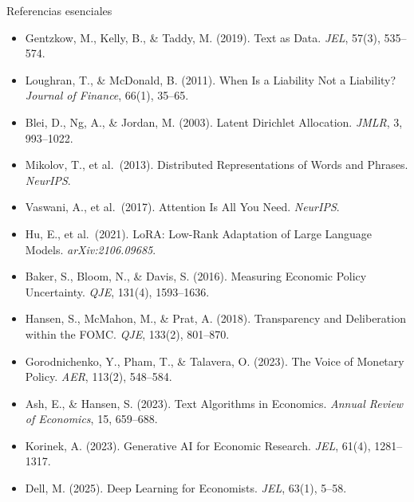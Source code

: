 \documentclass{beamer}
\newcommand{\1}{\mathbb{I}}
\begin{document}
\begin{frame}{Referencias esenciales}
\footnotesize
\begin{itemize}\itemsep2pt
  \item Gentzkow, M., Kelly, B., \& Taddy, M. (2019). Text as Data. \emph{JEL}, 57(3), 535--574.
  \item Loughran, T., \& McDonald, B. (2011). When Is a Liability Not a Liability? \emph{Journal of Finance}, 66(1), 35--65.
  \item Blei, D., Ng, A., \& Jordan, M. (2003). Latent Dirichlet Allocation. \emph{JMLR}, 3, 993--1022.
  \item Mikolov, T., et al.\ (2013). Distributed Representations of Words and Phrases. \emph{NeurIPS}.
  \item Vaswani, A., et al.\ (2017). Attention Is All You Need. \emph{NeurIPS}.
  \item Hu, E., et al.\ (2021). LoRA: Low-Rank Adaptation of Large Language Models. \emph{arXiv:2106.09685}.
  \item Baker, S., Bloom, N., \& Davis, S. (2016). Measuring Economic Policy Uncertainty. \emph{QJE}, 131(4), 1593--1636.
  \item Hansen, S., McMahon, M., \& Prat, A. (2018). Transparency and Deliberation within the FOMC. \emph{QJE}, 133(2), 801--870.
  \item Gorodnichenko, Y., Pham, T., \& Talavera, O. (2023). The Voice of Monetary Policy. \emph{AER}, 113(2), 548--584.
  \item Ash, E., \& Hansen, S. (2023). Text Algorithms in Economics. \emph{Annual Review of Economics}, 15, 659--688.
  \item Korinek, A. (2023). Generative AI for Economic Research. \emph{JEL}, 61(4), 1281--1317.
  \item Dell, M. (2025). Deep Learning for Economists. \emph{JEL}, 63(1), 5--58.
\end{itemize}
\normalsize
\end{frame}

\end{document}
